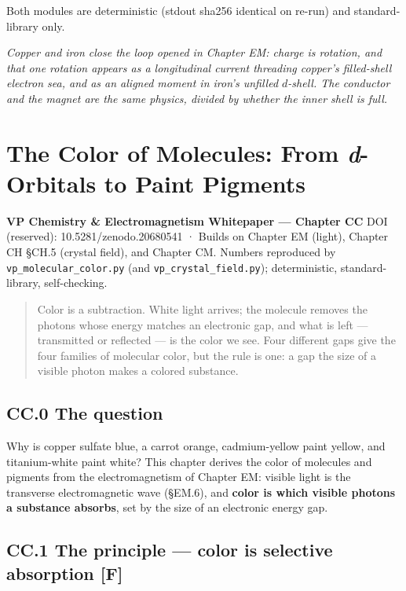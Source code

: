 \documentclass[
  10pt,
]{article}
\begin{document}
Both modules are deterministic (stdout sha256 identical on re-run) and
standard-library only.

\emph{Copper and iron close the loop opened in Chapter EM: charge is
rotation, and that one rotation appears as a longitudinal current
threading copper's filled-shell electron sea, and as an aligned moment
in iron's unfilled \(d\)-shell. The conductor and the magnet are the
same physics, divided by whether the inner shell is full.}

\hypertarget{the-color-of-molecules-from-d-orbitals-to-paint-pigments}{%
\section{\texorpdfstring{The Color of Molecules: From \emph{d}-Orbitals
to Paint
Pigments}{The Color of Molecules: From d-Orbitals to Paint Pigments}}\label{the-color-of-molecules-from-d-orbitals-to-paint-pigments}}

\textbf{VP Chemistry \& Electromagnetism Whitepaper --- Chapter CC} DOI
(reserved): 10.5281/zenodo.20680541 · Builds on Chapter EM (light),
Chapter CH §CH.5 (crystal field), and Chapter CM. Numbers reproduced by
\texttt{vp\_molecular\_color.py} (and \texttt{vp\_crystal\_field.py});
deterministic, standard-library, self-checking.

\begin{quote}
Color is a subtraction. White light arrives; the molecule removes the
photons whose energy matches an electronic gap, and what is left ---
transmitted or reflected --- is the color we see. Four different gaps
give the four families of molecular color, but the rule is one: a gap
the size of a visible photon makes a colored substance.
\end{quote}

\hypertarget{cc.0-the-question}{%
\subsection{CC.0 The question}\label{cc.0-the-question}}

Why is copper sulfate blue, a carrot orange, cadmium-yellow paint
yellow, and titanium-white paint white? This chapter derives the color
of molecules and pigments from the electromagnetism of Chapter EM:
visible light is the transverse electromagnetic wave (§EM.6), and
\textbf{color is which visible photons a substance absorbs}, set by the
size of an electronic energy gap.

\hypertarget{cc.1-the-principle-color-is-selective-absorption-f}{%
\subsection{\texorpdfstring{CC.1 The principle --- color is selective
absorption
\textbf{{[}F{]}}}{CC.1 The principle --- color is selective absorption {[}F{]}}}\label{cc.1-the-principle-color-is-selective-absorption-f}}
\end{document}
